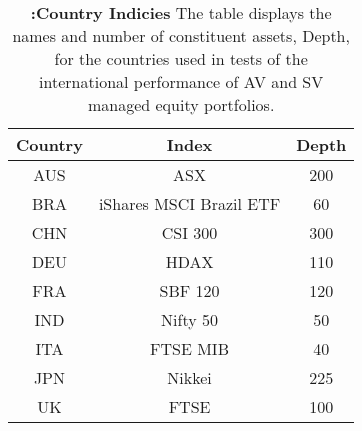 \begin{table}[!htbp] 
	\centering \caption{\textbf{:Country Indicies} \newline
		\footnotesize{The table displays the names and number of constituent assets, Depth, for the countries used in tests of the international performance of AV and SV managed equity portfolios.}} \vspace{3mm}
	\label{tab_countries}
\begin{tabular}{ccc}
	Country & Index & Depth \\ 
	\hline
	AUS	& ASX & 200 \\ 
	BRA & iShares MSCI Brazil ETF & 60 \\ 
	CHN & CSI 300 & 300 \\ 
	DEU & HDAX & 110 \\ 
	FRA & SBF 120 & 120 \\ 
	IND & Nifty 50  & 50 \\ 
	ITA & FTSE MIB  & 40 \\ 
	JPN & Nikkei & 225 \\ 
	UK & FTSE & 100\\
	\hline
\end{tabular} 
\end{table}